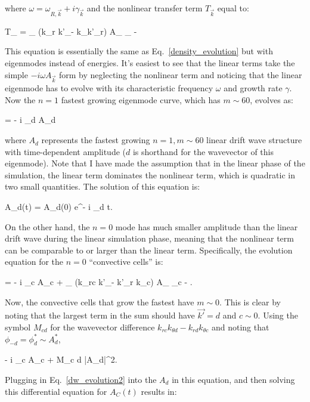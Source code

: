 where $\omega = \omega_{R,\vec{k}} + i \gamma_{\vec{k}}$ and the nonlinear transfer term $T_{\vec{k}}$ equal to:

\beq
\label{T_veck}
T_{} = \sum_{} (k_r k'_\theta - k_\theta k'_r) A_{} \phi_{ - }
\eeq

This equation is essentially the same as Eq.~\ref{density_evolution} but with eigenmodes instead of energies. It's easiest to see that the linear terms take the simple $-i \omega A_{\vec{k}}$
form by neglecting the nonlinear term and noticing
that the linear eigenmode has to evolve with its characteristic frequency $\omega$ and growth rate $\gamma$. Now the $n=1$ fastest growing eigenmode curve, which has $m \sim 60$,
evolves as:

\beq
\label{dw_evolution1}
 = - i \omega_d A_d
\eeq

where $A_d$ represents the fastest growing $n=1, m \sim 60$ linear drift wave structure with time-dependent amplitude ($d$ is shorthand for the wavevector of this eigenmode). 
Note that I have made the assumption that in the linear phase of the simulation, the linear term
dominates the nonlinear term, which is quadratic in two small quantities. The solution of this equation is:

\beq
\label{dw_evolution2}
A_d(t) = A_d(0) e^{- i \omega_d t}.
\eeq

On the other hand, the $n=0$ mode has much smaller amplitude than the linear drift wave during the linear simulation phase, meaning that the nonlinear term can be comparable to or larger than
the linear term. Specifically, the evolution equation for the $n=0$ ``convective cells'' is:

\beq
\label{cc_evolution1}
 = - i \omega_c A_c + \sum_{} (k_{rc} k'_\theta - k'_r k_{\theta c}) A_{} \phi_{c - }.
\eeq

Now, the convective cells that grow the fastest have $m \sim 0$. This is clear by noting that the largest term in the sum should have $\vec{k'} = d$ and $c \sim 0$. 
Using the symbol $M_{c d}$ for the wavevector difference $k_{r c} k_{\theta d} - k_{r d} k_{\theta c}$ and noting that $\phi_{-d} = \phi^*_d \sim A_d^*$,

\beq
\label{cc_evolution2}
 \approx - i \omega_c A_c + M_{c d} |A_d|^2.
\eeq

Plugging in Eq.~\ref{dw_evolution2} into the $A_d$ in this equation, and then solving this differential equation for $A_C(t)$ results in:

